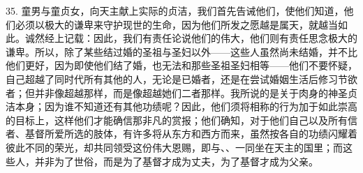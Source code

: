 35. 童男与童贞女，向天主献上实际的贞洁，我们首先告诫他们，使他们知道，他们必须以极大的谦卑来守护现世的生命，因为他们所发之愿越是属天，就越当如此。诚然经上记载：因此，我们有责任论说他们的伟大，他们则有责任思念极大的谦卑。所以，除了某些结过婚的圣祖与圣妇以外——这些人虽然尚未结婚，并不比他们更好，因为即使他们结了婚，也无法和那些圣祖圣妇相等——他们不要怀疑，自己超越了同时代所有其他的人，无论是已婚者，还是在尝试婚姻生活后修习节欲者；但并非像超越那样，而是像超越她们二者那样。我所说的是关于肉身的神圣贞洁本身；因为谁不知道还有其他功绩呢？因此，他们须将相称的行为加于如此崇高的目标上，这样他们才能确信那非凡的赏报；他们确知，对于他们自己以及所有信者、基督所爱所选的肢体，有许多将从东方和西方而来，虽然按各自的功绩闪耀着彼此不同的荣光，却共同领受这份伟大恩赐，即与、、一同坐在天主的国里；而这些人，并非为了世俗，而是为了基督才成为丈夫，为了基督才成为父亲。\par


